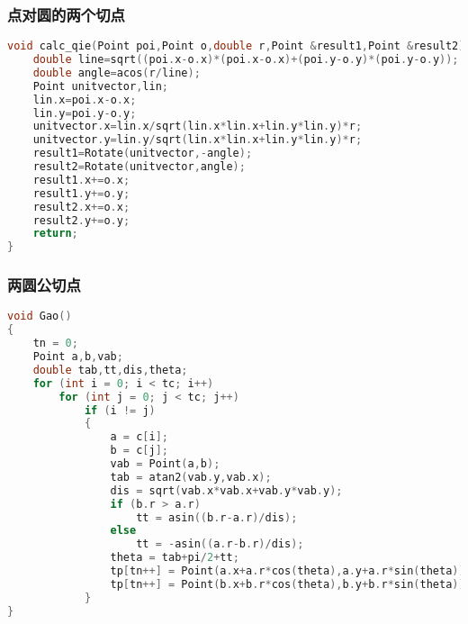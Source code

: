     \subsubsection{点对圆的两个切点}
	\begin{lstlisting}[language=c++]
void calc_qie(Point poi,Point o,double r,Point &result1,Point &result2) {
    double line=sqrt((poi.x-o.x)*(poi.x-o.x)+(poi.y-o.y)*(poi.y-o.y));
    double angle=acos(r/line);
    Point unitvector,lin;
    lin.x=poi.x-o.x;
    lin.y=poi.y-o.y;
    unitvector.x=lin.x/sqrt(lin.x*lin.x+lin.y*lin.y)*r;
    unitvector.y=lin.y/sqrt(lin.x*lin.x+lin.y*lin.y)*r;
    result1=Rotate(unitvector,-angle);
    result2=Rotate(unitvector,angle);
    result1.x+=o.x;
    result1.y+=o.y;
    result2.x+=o.x;
    result2.y+=o.y;
    return;
}
	\end{lstlisting}
	
    \subsubsection{两圆公切点}
	\begin{lstlisting}[language=c++]
void Gao()
{
    tn = 0;
    Point a,b,vab;
    double tab,tt,dis,theta;
    for (int i = 0; i < tc; i++)
        for (int j = 0; j < tc; j++)
            if (i != j)
            {
                a = c[i];
                b = c[j];
                vab = Point(a,b);
                tab = atan2(vab.y,vab.x);
                dis = sqrt(vab.x*vab.x+vab.y*vab.y);
                if (b.r > a.r)
                    tt = asin((b.r-a.r)/dis);
                else
                    tt = -asin((a.r-b.r)/dis);
                theta = tab+pi/2+tt;
                tp[tn++] = Point(a.x+a.r*cos(theta),a.y+a.r*sin(theta));
                tp[tn++] = Point(b.x+b.r*cos(theta),b.y+b.r*sin(theta));
            }
}
	\end{lstlisting}